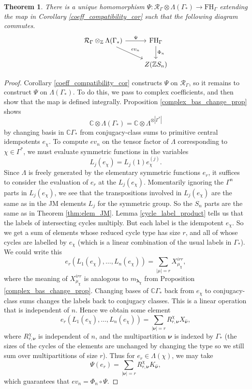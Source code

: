 \documentclass[10pt]{article}
\newtheorem{theorem}{Theorem}[section]
\theoremstyle{definition}
\newcommand{\bs}{\boldsymbol}
\newcommand{\RGamma}{\mathcal{R}_{\Gamma}}
\newcommand{\LambdaG}{\Lambda(\Gamma_*)}
\newcommand{\FHG}{\mathrm{FH}_{\Gamma}}
\begin{document}
\begin{theorem} \label{wreath_map_exists}
There is a unique homomorphism $\Psi: \RGamma \otimes \LambdaG \to \FHG$ extending the map in Corollary \ref{coeff_compatibility_cor} such that the following diagram commutes.
\begin{equation*}
\begin{tikzcd}
\RGamma \otimes_{\mathbb{Z}} \LambdaG    \arrow[r, "\Psi"]    \arrow[dr, "ev_n"]    &    \FHG    \arrow[d, "\Phi_n"]\\
&    Z(\mathbb{Z}S_n)
\end{tikzcd}
\end{equation*}
\end{theorem}
\begin{proof}
Corollary \ref{coeff_compatibility_cor} constructs $\Psi$ on $\RGamma$, so it remains to construct $\Psi$ on $\LambdaG$. To do this, we pass to complex coefficients, and then show that the map is defined integrally. Proposition \ref{complex_bas_change_prop} shows
\[
\mathbb{C} \otimes \LambdaG = \mathbb{C} \otimes \Lambda^{\otimes |\Gamma^*|}
\]
by changing basis in $\mathbb{C}\Gamma_*$ from conjugacy-class sums to primitive central idempotents $e_\chi$. To compute $ev_n$ on the tensor factor of $\Lambda$ corresponding to $\chi \in \Gamma^*$, we must evaluate symmetric functions in the variables
\[
L_j(e_\chi) = L_j(1) e_\chi^{(j)}.
\]
Since $\Lambda$ is freely generated by the elementary symmetric functions $e_r$, it suffices to consider the evaluation of $e_r$ at the $L_j(e_\chi)$. Momentarily ignoring the $\Gamma^n$ parts in $L_j(e_\chi)$, we see that the transpositions involved in $L_j(e_\chi)$ are the same as in the JM elements $L_j$ for the symmetric group. So the $S_n$ parts are the same as in Theorem \ref{thm:elem_JM}. Lemma \ref{cycle_label_product} tells us that the labels of intersecting cycles multiply. But each label is the idempotent $e_\chi$. So we get a sum of elements whose reduced cycle type has size $r$, and all of whose cycles are labelled by $e_\chi$ (which is a linear combination of the usual labels in $\Gamma_*$). We could write this
\[
e_r(L_1(e_\chi), \ldots, L_n(e_\chi)) = \sum_{|\mu| = r} X_{\mu_\chi}^{irr},
\]
where the meaning of $X_{\mu_\chi}^{irr}$ is analogous to $m_{\bs\lambda_\chi}$ from Proposition \ref{complex_bas_change_prop}. Changing bases of $\mathbb{C}\Gamma_*$ back from $e_\chi$ to conjugacy-class sums changes the labels back to conjugacy classes. This is a linear operation that is independent of $n$. Hence we obtain some element
\[
e_r(L_1(e_\chi), \ldots, L_n(e_\chi)) = \sum_{|\bs\nu| = r} R_{r, \bs\nu}^\chi X_{\bs\hat{\bs \nu}},
\]
where $R_{r, \bs\nu}^\chi$ is independent of $n$, and the multipartition $\bs\nu$ is indexed by $\Gamma_*$ (the sizes of the cycles of the elements are unchanged by changing the type so we still sum over multipartitions of size $r$). Thus for $e_r \in \Lambda(\chi)$, we may take
\[
\Psi(e_r) = \sum_{|\bs\nu| = r} R_{r, \bs\nu}^\chi K_{\bm\hat{\bs \nu}},
\]
which guarantees that $ev_n = \Phi_n \circ \Psi$.


\end{proof}
\end{document}
